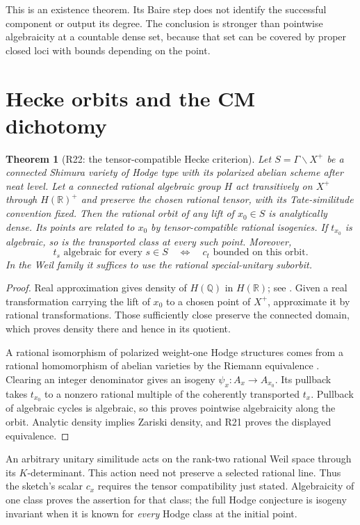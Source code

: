 \documentclass[11pt,a4paper]{article}
\newtheorem{theorem}{Theorem}[section]
\theoremstyle{definition}\newtheorem{definition}[theorem]{Definition}
\theoremstyle{remark}\newtheorem{remark}[theorem]{Remark}
\newcommand{\Q}{\mathbb Q}\newcommand{\Z}{\mathbb Z}\newcommand{\C}{\mathbb C}\newcommand{\R}{\mathbb R}
\begin{document}
This is an existence theorem. Its Baire step does not identify the successful component or output its degree. The conclusion is stronger than pointwise algebraicity at a countable dense set, because that set can be covered by proper closed loci with bounds depending on the point.

\section{Hecke orbits and the CM dichotomy}
\begin{theorem}[R22: the tensor-compatible Hecke criterion]\label{R22}
Let $S=\Gamma\backslash X^+$ be a connected Shimura variety of Hodge type with its polarized abelian scheme after neat level. Let a connected rational algebraic group $H$ act transitively on $X^+$ through $H(\R)^+$ and preserve the chosen rational tensor, with its Tate-similitude convention fixed. Then the rational orbit of any lift of $x_0\in S$ is analytically dense. Its points are related to $x_0$ by tensor-compatible rational isogenies. If $t_{x_0}$ is algebraic, so is the transported class at every such point. Moreover,
\[
 t_s\text{ algebraic for every }s\in S
 \quad\Longleftrightarrow\quad
 c_t\text{ bounded on this orbit}.
\]
In the Weil family it suffices to use the rational special-unitary suborbit.
\end{theorem}
\begin{proof}
Real approximation gives density of $H(\Q)$ in $H(\R)$; see \citet[Theorem~5.4, p.~54; Lemma~13.5, p.~118]{MilneShim}. Given a real transformation carrying the lift of $x_0$ to a chosen point of $X^+$, approximate it by rational transformations. Those sufficiently close preserve the connected domain, which proves density there and hence in its quotient.

A rational isomorphism of polarized weight-one Hodge structures comes from a rational homomorphism of abelian varieties by the Riemann equivalence \citep[Corollary~6.9, p.~73]{MilneShim}. Clearing an integer denominator gives an isogeny $\psi_x:A_x\to A_{x_0}$. Its pullback takes $t_{x_0}$ to a nonzero rational multiple of the coherently transported $t_x$. Pullback of algebraic cycles is algebraic, so this proves pointwise algebraicity along the orbit. Analytic density implies Zariski density, and R21 proves the displayed equivalence.
\end{proof}

An arbitrary unitary similitude acts on the rank-two rational Weil space through its $K$-determinant. This action need not preserve a selected rational line. Thus the sketch's scalar $c_x$ requires the tensor compatibility just stated. Algebraicity of one class proves the assertion for that class; the full Hodge conjecture is isogeny invariant when it is known for \emph{every} Hodge class at the initial point.
\end{document}
